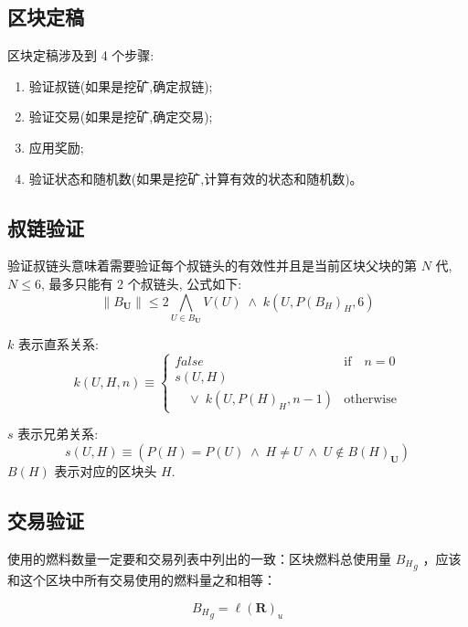 \documentclass[9pt,oneside]{amsart}
\begin{document}
\begin{multicols}{2}
\section{区块定稿} \label{ch:finalisation}

区块定稿涉及到 4 个步骤:

\begin{enumerate}
\item 验证叔链(如果是挖矿,确定叔链);
\item 验证交易(如果是挖矿,确定交易);
\item 应用奖励;
\item 验证状态和随机数(如果是挖矿,计算有效的状态和随机数)。
\end{enumerate}

\subsection{叔链验证}

验证叔链头意味着需要验证每个叔链头的有效性并且是当前区块父块的第 $N$ 代, $N \leq 6$, 最多只能有 2 个叔链头, 公式如下:
\begin{equation}
\lVert B_\mathbf{U} \rVert \leqslant 2 \bigwedge_{U \in B_\mathbf{U}} V(U) \; \wedge \; k(U, P(B_H)_H, 6)
\end{equation}

$k$ 表示直系关系:
\begin{equation}
k(U, H, n) \equiv \begin{cases} false & \text{if} \quad n = 0 \\
s(U, H) &\\
\quad \vee \; k(U, P(H)_H, n - 1) & \text{otherwise}
\end{cases}
\end{equation}

$s$ 表示兄弟关系:
\begin{equation}
s(U, H) \equiv (P(H) = P(U)\; \wedge \; H \neq U \; \wedge \; U \notin B(H)_\mathbf{U})
\end{equation}
$B(H)$ 表示对应的区块头 $H$.

\subsection{交易验证}

使用的燃料数量一定要和交易列表中列出的一致：区块燃料总使用量 ${B_H}_g$ ，应该和这个区块中所有交易使用的燃料量之和相等：

\begin{equation}
{B_H}_g = \ell(\mathbf{R})_u
\end{equation}


\end{multicols}
\end{document}
